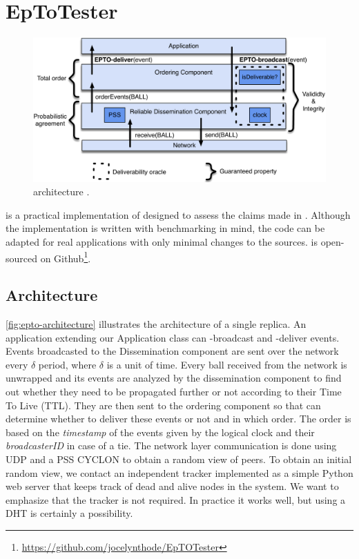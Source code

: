 \section{EpToTester}
\label{sec:epto}
\begin{figure}[htp]
	\includegraphics[width=\linewidth]{figures/architecture.pdf}
	\caption{\epto architecture \autocite{matos2015epto}.}
	\label{fig:epto-architecture}
\end{figure}
\eptotester is a practical implementation of \epto designed to assess the claims made in \autocite{matos2015epto}. Although the implementation is written with benchmarking in mind, the code can be adapted for real applications with only minimal changes to the sources. \eptotester is open-sourced on Github\footnote{\href{https://github.com/jocelynthode/EpTOTester}{https://github.com/jocelynthode/EpTOTester}}.
\subsection{Architecture}
\autoref{fig:epto-architecture} illustrates the architecture of a single replica. An application extending our Application class can \epto-broadcast and \epto-deliver events. Events broadcasted to the Dissemination component are sent over the network every $\delta$ period, where $\delta$ is a unit of time. Every ball received from the network is unwrapped and its events are analyzed by the dissemination component to find out whether they need to be propagated further or not according to their Time To Live (TTL). They are then sent to the ordering component so that \epto can determine whether to deliver these events or not and in which order. The order is based on the \textit{timestamp} of the events given by the logical clock and their \textit{broadcasterID} in case of a tie. The network layer communication is done using UDP and a PSS CYCLON to obtain a random view of peers. To obtain an initial random view, we contact an independent tracker implemented as a simple Python web server that keeps track of dead and alive nodes in the system. We want to emphasize that the tracker is not required. In practice it works well, but using a DHT is certainly a possibility.
